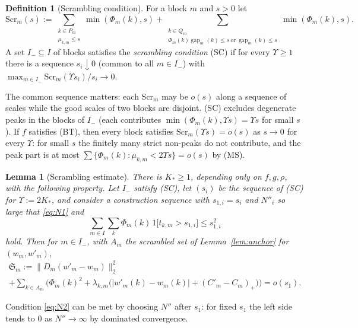 \documentclass[10pt]{amsart}
\newtheorem{lemma}[theorem]{Lemma}
\theoremstyle{definition}
\newtheorem{definition}[theorem]{Definition}
\theoremstyle{remark}
\newcommand{\gap}{\operatorname{gap}}
\begin{document}
\begin{definition}[Scrambling condition]\label{def:SC}
For a block $m$ and $s>0$ let
\[
 \mathrm{Scr}_m(s):=\sum_{\substack{k\in P_m\\ \mu_{k,m}\le s}}
 \min(\Phi_m(k),s)+\sum_{\substack{k\in Q_m\\ \Phi_m(k)\gap_m(k)\le s\ \text{or}
 \ \gap_m(k)\le s}}\min(\Phi_m(k),s).
\]
A set $I_-\subseteq I$ of blocks satisfies the \emph{scrambling condition}
\textup{(SC)} if for every $\Upsilon\ge1$ there is a sequence $s_i\downarrow0$
\textup{(}common to all $m\in I_-$\textup{)} with
$\max_{m\in I_-}\mathrm{Scr}_m(\Upsilon s_i)/s_i\to0$.
\end{definition}

The common sequence matters: each $\mathrm{Scr}_m$ may be $o(s)$ along a
sequence of scales while the good scales of two blocks are disjoint.
\textup{(SC)} excludes degenerate peaks in the blocks of $I_-$ (each
contributes $\min(\Phi_m(k),\Upsilon s)=\Upsilon s$ for small $s$).  If $f$ satisfies
\textup{(BT)}, then every block satisfies $\mathrm{Scr}_m(\Upsilon s)=o(s)$ as
$s\to0$ for every $\Upsilon$: for small $s$ the finitely many strict non-peaks do not
contribute, and the peak part is at most
$\sum\{\Phi_m(k):\mu_{k,m}<2\Upsilon s\}=o(s)$ by \textup{(MS)}.

\begin{lemma}[Scrambling estimate]\label{lem:scrambling}
There is $K_*\ge1$, depending only on $f,g,\rho$, with the following
property.  Let $I_-$ satisfy \textup{(SC)}, let $(s_i)$ be the sequence of
\textup{(SC)} for $\Upsilon:=2K_*$, and consider a construction sequence with
$s_{1,i}=s_i$ and $N''_i$ so large that \eqref{eq:N1} and
\begin{equation}\label{eq:N2}
 \sum_{m\in I}\sum_k\Phi_m(k)\,1\big[t_{k,m}>s_{1,i}\big]\le s_{1,i}^2
\end{equation}
hold.  Then for $m\in I_-$, with $A_m$ the scrambled set of
Lemma~\ref{lem:anchor} for $(w_m,w'_m)$,
\begin{multline*}
 \mathfrak S_m:=\|D_m(w'_m-w_m)\|_2^2\\
 +\sum_{k\in A_m}\Big(\Phi_m(k)^2+
 \lambda_{k,m}\big(|w'_m(k)-w_m(k)|+(C'_m-C_m)_+\big)\Big)=o(s_1).
\end{multline*}
\end{lemma}

Condition \eqref{eq:N2} can be met by choosing $N''$ after $s_1$: for fixed
$s_1$ the left side tends to $0$ as $N''\to\infty$ by dominated convergence.
\end{document}

